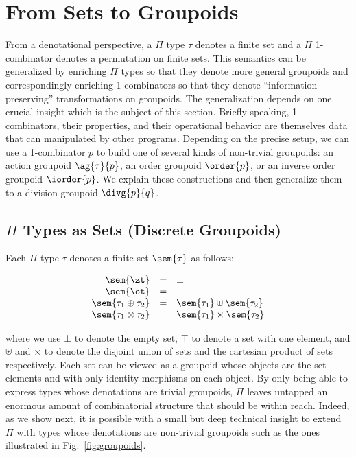 \section{From Sets to Groupoids} 
\label{sec:groupoids}

From a denotational perspective, a $\Pi$ type $\tau$ denotes a finite
set and a $\Pi$ 1-combinator denotes a permutation on finite
sets. This semantics can be generalized by enriching $\Pi$ types so
that they denote more general groupoids and correspondingly enriching
1-combinators so that they denote ``information-preserving''
transformations on groupoids. The generalization depends on one
crucial insight which is the subject of this section. Briefly
speaking, 1-combinators, their properties, and their operational
behavior are themselves data that can manipulated by other
programs. Depending on the precise setup, we can use a 1-combinator
$p$ to build one of several kinds of non-trivial groupoids: an action
groupoid $\ag{\tau}{p}$, an order groupoid $\order{p}$, or an inverse
order groupoid $\iorder{p}$. We explain these constructions and then
generalize them to a division groupoid $\divg{p}{q}$. 

\subsection{$\Pi$ Types as Sets (Discrete Groupoids)}

Each $\Pi$ type $\tau$ denotes a finite set $\sem{\tau}$ as follows:

\[\begin{array}{rcl}
\sem{\zt} &=& \bot \\
\sem{\ot} &=& \top \\
\sem{\tau_1 \oplus \tau_2} &=& \sem{\tau_1} \uplus \sem{\tau_2} \\
\sem{\tau_1 \otimes \tau_2} &=& \sem{\tau_1} \times \sem{\tau_2}
\end{array}\]

\noindent where we use $\bot$ to denote the empty set, $\top$ to
denote a set with one element, and $\uplus$ and $\times$ to denote the
disjoint union of sets and the cartesian product of sets
respectively. Each set can be viewed as a groupoid whose objects are
the set elements and with only identity morphisms on each object. By
only being able to express types whose denotations are trivial
groupoids, $\Pi$ leaves untapped an enormous amount of combinatorial
structure that should be within reach. Indeed, as we show next, it is
possible with a small but deep technical insight to extend $\Pi$ with
types whose denotations are non-trivial groupoids such as the ones
illustrated in Fig.~\ref{fig:groupoids}.

